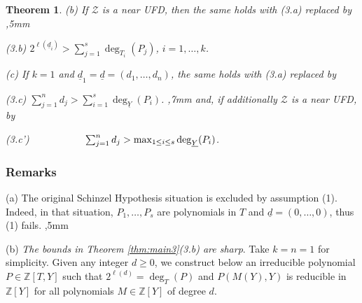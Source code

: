 \documentclass[11pt,a4paper,reqno]{amsart}
\def\Z{\mathbb{Z}}
\newtheorem{thm}{Theorem}[section]
\theoremstyle{definition}
\begin{document}
\begin{thm}
\noindent
{\rm (b)} If ${\mathcal Z}$ is a {\it near UFD}, then the same holds with {\rm (3.a)}
replaced by 
,5mm

\noindent
{\rm (3.b)} \hskip 20mm $2^{\ell({\underline d}_i)} > \sum_{j=1}^s \deg_{T_i}(P_j)$, \hskip 3mm $i=1,\ldots,k$.
\vskip 2mm

\noindent
{\rm (c)} If $k=1$ and $\underline {d}_1 = \underline d = (d_1,\ldots,d_n)$, 
the same holds with {\rm (3.a)}
replaced by 
\vskip 1mm

\noindent
{\rm (3.c)} \hskip 20mm $\sum_{j=1}^n d_j > \sum_{i=1}^s\deg_{\underline{Y}}(P_i)$.
,7mm
\noindent
and, if additionally ${\mathcal Z}$ is a {near UFD}, by 
\vskip 1mm


\noindent 
{\rm (3.c')}$ \hskip 20mm\sum_{j=1}^n d_j  > \max_{1 \leq i \leq s}\deg_{\underline{Y}}(P_i)$.

\end{thm}


\subsubsection{Remarks}
(a) The original Schinzel Hypothesis situation is excluded by assumption (1). Indeed, in that situation,  $P_1,\ldots,P_s$ are polynomials in $T$ and $\underline d=(0,\ldots,0)$, thus (1) fails.
,5mm


\noindent
(b) \emph{The bounds in Theorem \ref{thm:main3}(3.b) are sharp}. Take $k=n=1$ for simplicity. Given any integer $d\geq 0$, we construct below an irreducible polynomial $P\in \Z[T,Y]$ such that $2^{\ell(d)} = \deg_T(P)$ and $P(M(Y),Y)$ is reducible in $\Z[Y]$ for all polynomials $M\in \Z[Y]$ of degree $d$. 
\end{document}
